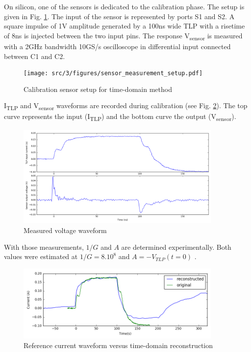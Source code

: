 On silicon, one of the sensors is dedicated to the calibration phase.
The setup is given in Fig. \ref{fig:calibration-sensor}.
The input of the sensor is represented by ports S1 and S2.
A square impulse of 1V amplitude generated by a 100ns wide TLP with a risetime of 8ns is injected between the two input pins.
The response V\textsubscript{sensor} is measured with a 2GHz bandwidth 10GS/s oscilloscope in differential input connected between C1 and C2.

\begin{figure}[!h]
  \centering
  \texttt{[image: src/3/figures/sensor\_measurement\_setup.pdf]}
  \caption{Calibration sensor setup for time-domain method}
  \label{fig:calibration-sensor}
\end{figure}

I\textsubscript{TLP} and V\textsubscript{sensor} waveforms are recorded during calibration (see Fig. \ref{fig:measurement-nfs}).
The top curve represents the input (I\textsubscript{TLP}) and the bottom curve the output (V\textsubscript{sensor}).

\begin{figure}[!h]
  \centering
  \includegraphics[width=0.9\textwidth]{src/3/figures/measured_waveform.png}
  \caption{Measured voltage waveform}
  \label{fig:measurement-nfs}
\end{figure}

With those measurements, $1/G$ and $A$ are determined experimentally.
Both values were estimated at $1/G = 8.10^8$ and $A = -V_{TLP}(t = 0)$ .

\begin{figure}[!h]
  \centering
  \includegraphics[width=0.9\textwidth]{src/3/figures/time_domain_vs_ref.png}
  \caption{Reference current waveform versus time-domain reconstruction}
  \label{fig:time-domain-reconstructed}
\end{figure}

